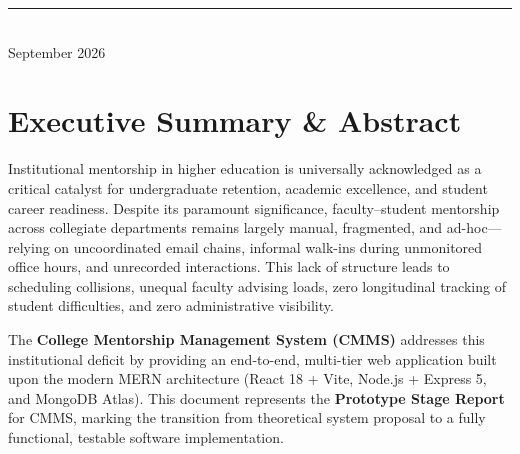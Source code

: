 \documentclass[11pt,a4paper]{article}
\begin{document}
\begin{titlepage}
  \vfill
  \rule{0.6\linewidth}{0.4pt} \\
  {\small\textsf{September 2026}}
\end{titlepage}

\newpage
{}
\tableofcontents
\vspace{0.8cm}
\listoffigures
\vspace{0.8cm}
\listoftables
\newpage
{}

\section{Executive Summary \& Abstract}
Institutional mentorship in higher education is universally acknowledged as a critical catalyst for undergraduate retention, academic excellence, and student career readiness. Despite its paramount significance, faculty--student mentorship across collegiate departments remains largely manual, fragmented, and ad-hoc---relying on uncoordinated email chains, informal walk-ins during unmonitored office hours, and unrecorded interactions. This lack of structure leads to scheduling collisions, unequal faculty advising loads, zero longitudinal tracking of student difficulties, and zero administrative visibility.

The \textbf{College Mentorship Management System (CMMS)} addresses this institutional deficit by providing an end-to-end, multi-tier web application built upon the modern MERN architecture (React 18 + Vite, Node.js + Express 5, and MongoDB Atlas). This document represents the \textbf{Prototype Stage Report} for CMMS, marking the transition from theoretical system proposal to a fully functional, testable software implementation.
\end{document}
